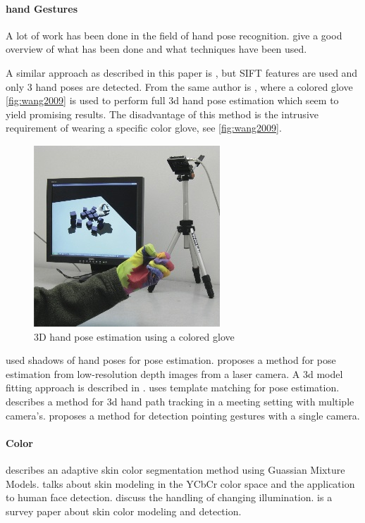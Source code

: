 \paragraph{hand Gestures}
A lot of work has been done in the field of hand pose recognition. \citep{Erol2007,Mitra2007} give a good overview of what has been done and what techniques have been used.

A similar approach as described in this paper is \citep{Wang2007}, but SIFT features are used and only 3 hand poses are detected. From the same author is \citep{Wang2009}, where a colored glove \autoref{fig:wang2009} is used to perform full 3d hand pose estimation which seem to yield promising results. The disadvantage of this method is the intrusive requirement of wearing a specific color glove, see \autoref{fig:wang2009}.

\begin{figure}[tb]
	\center{}
	\includegraphics[width=0.4\linewidth]{figures/wang2009.jpg}
	\caption{3D hand pose estimation using a colored glove}
	\label{fig:wang2009}
\end{figure}

\citep{Segen1999} used shadows of hand poses for pose estimation. \citep{Mo2006} proposes a method for pose estimation from low-resolution depth images from a laser camera. A 3d model fitting approach is described in \citep{Athitsos2003,laGorce2010}. \citep{Stenger2006} uses template matching for pose estimation. \citep{Xiong2006} describes a method for 3d hand path tracking in a meeting setting with multiple camera's. \citep{Nickel2007} proposes a method for detection pointing gestures with a single camera.


\paragraph{Color}
 \citep{Hassanpour2008} describes an adaptive skin color segmentation method using Guassian Mixture Models. \citep{Phung2002} talks about skin modeling in the YCbCr color space and the application to human face detection. \citep{Sigal2004,Soriano2000,Stoerring1999} discuss the handling of changing illumination. \citep{Kakumanu2007} is a survey paper about skin color modeling and detection.


